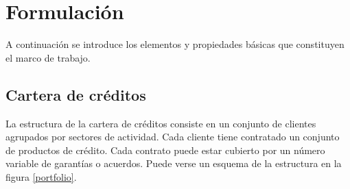 
%
%
%
%
%
%
%
%
%

\chapter{Formulaci\'on}
\label{sec:formulation}

\begin{center}
\end{center}

A continuaci\'on se introduce los elementos y propiedades b\'asicas que 
constituyen el marco de trabajo.


\section{Cartera de cr\'editos}

La estructura de la cartera de cr\'editos consiste en un conjunto de
clientes agrupados por sectores de actividad. Cada cliente tiene contratado 
un conjunto de productos de cr\'edito. Cada contrato puede estar 
cubierto por un n\'umero variable de garant\'ias o acuerdos.
Puede verse un esquema de la estructura en la figura \ref{portfolio}.

